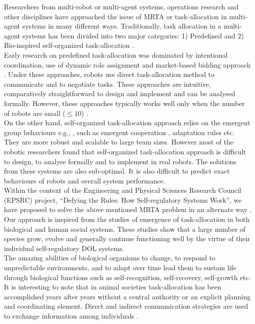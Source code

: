 Researchers from multi-robot or multi-agent systems, operations research and other disciplines have approached the issue of MRTA or task-allocation in multi-agent systems in many different ways. Traditionally, task allocation in a multi-agent systems has been divided into two major categories: 1) Predefined and 2) Bio-inspired self-organized task-allocation \cite{Shen+2001}.\\
Early research on predefined task-allocation was dominated by intentional coordination, use of dynamic role assignment \cite{Parker2008} and market-based bidding approach \cite{Dias+2006}. Under these approaches, robots use direct task-allocation method to communicate and to negotiate tasks. These approaches are intuitive, comparatively straightforward to design and implement and can be analysed formally. However, these approaches typically works well only when the number of robots are small ($\leq 10$) \cite{Lerman+2006}.\\
On the other hand, self-organized task-allocation approach relies on the emergent group behaviours e.g., \cite{Kube+1993}, such as emergent cooperation \cite{Lerman+2006}, adaptation rules \cite{Liu+2007} etc. They are more robust and scalable to large team sizes. However most of the robotic researchers found that self-organized task-allocation approach is difficult to design, to analyse formally and to implement in real robots. The solutions from these systems are also sub-optimal. It is also difficult to predict exact behaviours of robots and overall system performance.\\
Within the context of the Engineering and Physical Sciences Research Council (EPSRC) project, ``Defying the Rules: How Self-regulatory Systems Work'', we have proposed to solve the above mentioned MRTA problem in an alternate way \cite{Arcaute+2008}. Our approach is inspired from the studies of emergence of task-allocation in both biological and human social systems. These studies show that a large number of species grow, evolve and generally continue functioning well by the virtue of their individual self-regulatory DOL systems.\\
The amazing abilities of biological organisms to change, to respond to unpredictable environments, and to adapt over time lead them to sustain life through biological functions such as self-recognition, self-recovery, self-growth etc. It is interesting to note that in animal societies task-allocation has been accomplished years after years without a central authority or an explicit planning and coordinating element. Direct and indirect communication strategies are used to exchange information among individuals \cite{Camazine+2001}.\\
